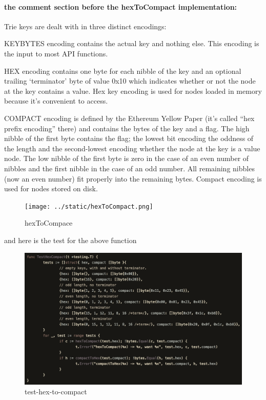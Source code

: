 \documentclass[11pt]{article}
\begin{document}
    \hypertarget{the-comment-section-before-the-hextocompact-implementation}{%
\paragraph{the comment section before the hexToCompact
implementation:}\label{the-comment-section-before-the-hextocompact-implementation}}

Trie keys are dealt with in three distinct encodings:

KEYBYTES encoding contains the actual key and nothing else. This
encoding is the input to most API functions.

HEX encoding contains one byte for each nibble of the key and an
optional trailing `terminator' byte of value 0x10 which indicates
whether or not the node at the key contains a value. Hex key encoding is
used for nodes loaded in memory because it's convenient to access.

COMPACT encoding is defined by the Ethereum Yellow Paper (it's called
``hex prefix encoding'' there) and contains the bytes of the key and a
flag. The high nibble of the first byte contains the flag; the lowest
bit encoding the oddness of the length and the second-lowest encoding
whether the node at the key is a value node. The low nibble of the first
byte is zero in the case of an even number of nibbles and the first
nibble in the case of an odd number. All remaining nibbles (now an even
number) fit properly into the remaining bytes. Compact encoding is used
for nodes stored on disk.

    \begin{figure}
\centering
\texttt{[image: ../static/hexToCompact.png]}
\caption{hexToCompace}
\end{figure}

    and here is the test for the above function

    \begin{figure}
\centering
\includegraphics{../static/test-hex-to-compact.png}
\caption{test-hex-to-compact}
\end{figure}
\end{document}
